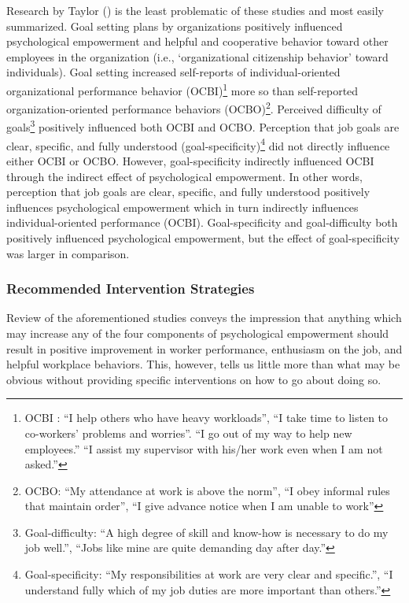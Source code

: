 \documentclass[
  11pt,
  a4paper,
]{article}
\begin{document}
Research by Taylor () is the least
problematic of these studies and most easily summarized. Goal setting
plans by organizations positively influenced psychological empowerment
and helpful and cooperative behavior toward other employees in the
organization (i.e., `organizational citizenship behavior' toward
individuals). Goal setting increased self-reports of individual-oriented
organizational performance behavior (OCBI)\footnote{OCBI : ``I help
  others who have heavy workloads'', ``I take time to listen to
  co-workers' problems and worries''. ``I go out of my way to help new
  employees.'' ``I assist my supervisor with his/her work even when I am
  not asked.''} more so than self-reported organization-oriented
performance behaviors (OCBO)\footnote{OCBO: ``My attendance at work is
  above the norm'', ``I obey informal rules that maintain order'', ``I
  give advance notice when I am unable to work''}. Perceived difficulty
of goals\footnote{Goal-difficulty: ``A high degree of skill and know-how
  is necessary to do my job well.'', ``Jobs like mine are quite
  demanding day after day.''} positively influenced both OCBI and OCBO.
Perception that job goals are clear, specific, and fully understood
(goal-specificity)\footnote{Goal-specificity: ``My responsibilities at
  work are very clear and specific.'', ``I understand fully which of my
  job duties are more important than others.''} did not directly
influence either OCBI or OCBO. However, goal-specificity indirectly
influenced OCBI through the indirect effect of psychological
empowerment. In other words, perception that job goals are clear,
specific, and fully understood positively influences psychological
empowerment which in turn indirectly influences individual-oriented
performance (OCBI). Goal-specificity and goal-difficulty both positively
influenced psychological empowerment, but the effect of goal-specificity
was larger in comparison.

\subsubsection{Recommended Intervention
Strategies}\label{recommended-intervention-strategies}

Review of the aforementioned studies conveys the impression that
anything which may increase any of the four components of psychological
empowerment should result in positive improvement in worker performance,
enthusiasm on the job, and helpful workplace behaviors. This, however,
tells us little more than what may be obvious without providing specific
interventions on how to go about doing so.
\end{document}
